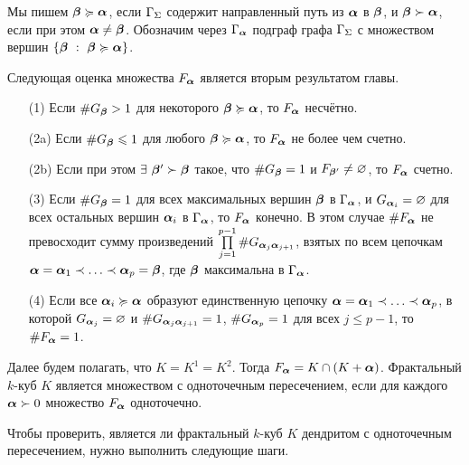 \documentclass[a5paper,9pt,twoside]{extarticle} %
\begin{document}
Мы пишем ${\bm{\beta}}\succcurlyeq{\bm{\alpha}}$, если $\Gamma_\Sigma$ содержит направленный путь из ${\bm{\alpha}}$ в ${\bm{\beta}}$, и ${\bm{\beta}}\succ{\bm{\alpha}}$, если при этом ${\bm{\alpha}}\neq{\bm{\beta}}$.
Обозначим через $\Gamma_{\bm{\alpha}}$ подграф графа $\Gamma_\Sigma$ с множеством вершин $\{{\bm{\beta}}\ :\ {\bm{\beta}}\succcurlyeq{\bm{\alpha}}\}$.

Следующая оценка множества $F_{\bm{\alpha}}$ является вторым результатом главы.\\

{\em \begin{enumerate}[nolistsep]
\item[(1)] Если $\#G_{\bm{\beta}}>1$ для некоторого ${\bm{\beta}}\succcurlyeq{\bm{\alpha}}$, то $F_{\bm{\alpha}}$ несчётно.
\item[(2a)] Если $\#G_{\bm{\beta}}\leqslant1$ для любого ${\bm{\beta}}\succcurlyeq{\bm{\alpha}}$, то $F_{\bm{\alpha}}$ не более чем счетно.
\item[(2b)] Если при этом $\exists\ {\bm{\beta}}'\succ{\bm{\beta}}$ такое, что $\#G_{\bm{\beta}}=1$ и $F_{{\bm{\beta}}'}\neq\varnothing$, то $F_{\bm{\alpha}}$ счетно.
\item[(3)] Если $\#G_{\bm{\beta}}=1$ для всех максимальных вершин ${\bm{\beta}}$ в $\Gamma_{\bm{\alpha}}$, и $G_{{\bm{\alpha}}_i}=\varnothing$ для всех остальных вершин ${\bm{\alpha}}_i$ в $\Gamma_{\bm{\alpha}}$, то $F_{\bm{\alpha}}$ конечно.
В этом случае $\#F_{\bm{\alpha}}$ не превосходит сумму произведений $\prod \limits_{j=1}^{p-1}\# G_{{\bm{\alpha}}_j{\bm{\alpha}}_{j+1}}$, взятых по всем цепочкам ${\bm{\alpha}}={\bm{\alpha}}_1\prec\ldots\prec{\bm{\alpha}}_p={\bm{\beta}}$, где ${\bm{\beta}}$ максимальна в $\Gamma_{\bm{\alpha}}$.
\item[(4)] Если все ${\bm{\alpha}}_i\succcurlyeq{\bm{\alpha}}$ образуют единственную цепочку ${\bm{\alpha}}={\bm{\alpha}}_1\prec\ldots\prec{\bm{\alpha}}_p$, в которой $G_{{\bm{\alpha}}_j}=\varnothing$ и $\# G_{{\bm{\alpha}}_j{\bm{\alpha}}_{j+1}}=1$, $\#G_{{\bm{\alpha}}_p}=1$ для всех $j\le p-1$, то $\#F_{\bm{\alpha}}=1$.
\end{enumerate} \quad}

Далее будем полагать, что $K=K^1=K^2$.
Тогда $F_{\bm{\alpha}}=K\cap(K+{\bm{\alpha}})$.
Фрактальный $k$-куб $K$ является множеством с одноточечным пересечением, если для каждого ${\bm{\alpha}}\succ0$ множество $F_{\bm{\alpha}}$ одноточечно.

Чтобы проверить, является ли фрактальный $k$-куб $K$ дендритом с одноточечным пересечением, нужно выполнить следующие шаги.\\
\end{document}
